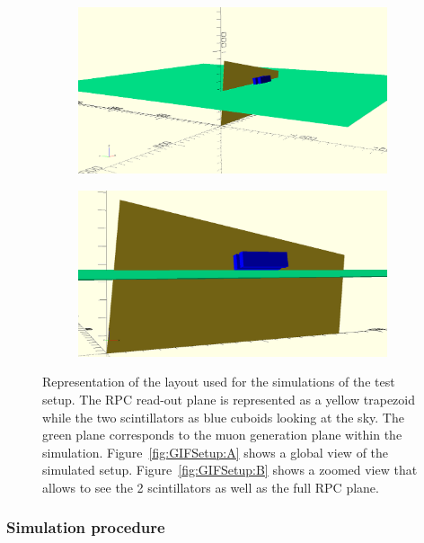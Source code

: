	\begin{figure}[H]
		\begin{subfigure}{\linewidth}
			\centering
			\includegraphics[width = 0.8\plotwidth]{fig/chapt5/GIFSetup-SimA.png}\\
			\caption{\label{fig:SimGIFLay:A}}
		\end{subfigure}
		\begin{subfigure}{\linewidth}
			\centering
			\includegraphics[width = 0.8\plotwidth]{fig/chapt5/GIFSetup-SimB.png}
			\caption{\label{fig:SimGIFLay:B}}
		\end{subfigure}
		\caption{\label{fig:SimGIFLay} Representation of the layout used for the simulations of the test setup. The RPC read-out plane is represented as a yellow trapezoid while the two scintillators as blue cuboids looking at the sky. The green plane corresponds to the muon generation plane within the simulation. Figure~\ref{fig:GIFSetup:A} shows a global view of the simulated setup. Figure~\ref{fig:GIFSetup:B} shows a zoomed view that allows to see the 2 scintillators as well as the full RPC plane.}
	\end{figure}
		
		\subsubsection{Simulation procedure}
		\label{chapt5:sssec:SimProc}
		
